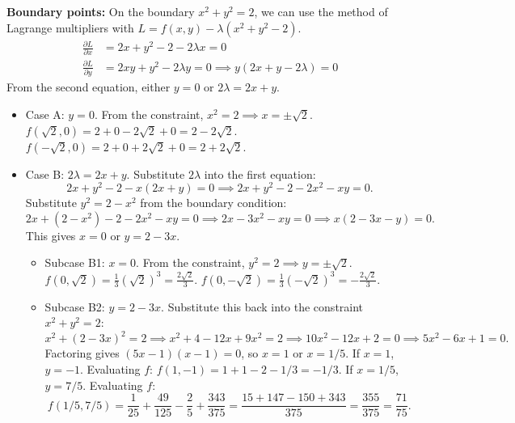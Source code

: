 \documentclass{article}
\begin{document}
\begin{enumerate}[label=\fbox{\arabic*}]
        \textbf{Boundary points:}
        On the boundary $x^2 + y^2 = 2$, we can use the method of Lagrange multipliers with $L = f(x, y) - \lambda(x^2 + y^2 - 2)$.
        \begin{align*}
          \frac{\partial L}{\partial x} &= 2x + y^2 - 2 - 2\lambda x = 0 \\
          \frac{\partial L}{\partial y} &= 2xy + y^2 - 2\lambda y = 0 \implies y(2x + y - 2\lambda) = 0
        \end{align*}
        From the second equation, either $y = 0$ or $2\lambda = 2x + y$.
        \begin{itemize}
          \item Case A: $y = 0$. From the constraint, $x^2 = 2 \implies x = \pm \sqrt{2}$.
          $f(\sqrt{2}, 0) = 2 + 0 - 2\sqrt{2} + 0 = 2 - 2\sqrt{2}$.
          $f(-\sqrt{2}, 0) = 2 + 0 + 2\sqrt{2} + 0 = 2 + 2\sqrt{2}$.
          \item Case B: $2\lambda = 2x + y$. Substitute $2\lambda$ into the first equation:
          \[
            2x + y^2 - 2 - x(2x + y) = 0 \implies 2x + y^2 - 2 - 2x^2 - xy = 0.
          \]
          Substitute $y^2 = 2 - x^2$ from the boundary condition:
          \[
            2x + (2 - x^2) - 2 - 2x^2 - xy = 0 \implies 2x - 3x^2 - xy = 0 \implies x(2 - 3x - y) = 0.
          \]
          This gives $x = 0$ or $y = 2 - 3x$.
          \begin{itemize}
            \item Subcase B1: $x = 0$. From the constraint, $y^2 = 2 \implies y = \pm \sqrt{2}$.
            $f(0, \sqrt{2}) = \frac{1}{3}(\sqrt{2})^3 = \frac{2\sqrt{2}}{3}$.
            $f(0, -\sqrt{2}) = \frac{1}{3}(-\sqrt{2})^3 = -\frac{2\sqrt{2}}{3}$.
            \item Subcase B2: $y = 2 - 3x$. Substitute this back into the constraint $x^2 + y^2 = 2$:
            \[
              x^2 + (2 - 3x)^2 = 2 \implies x^2 + 4 - 12x + 9x^2 = 2 \implies 10x^2 - 12x + 2 = 0 \implies 5x^2 - 6x + 1 = 0.
            \]
            Factoring gives $(5x - 1)(x - 1) = 0$, so $x = 1$ or $x = 1/5$.
            If $x = 1$, $y = -1$. Evaluating $f$: $f(1, -1) = 1 + 1 - 2 - 1/3 = -1/3$.
            If $x = 1/5$, $y = 7/5$. Evaluating $f$:
            \[
              f(1/5, 7/5) = \frac{1}{25} + \frac{49}{125} - \frac{2}{5} + \frac{343}{375} = \frac{15 + 147 - 150 + 343}{375} = \frac{355}{375} = \frac{71}{75}.
            \]
          \end{itemize}
        \end{itemize}
        

\end{enumerate}
\end{document}
